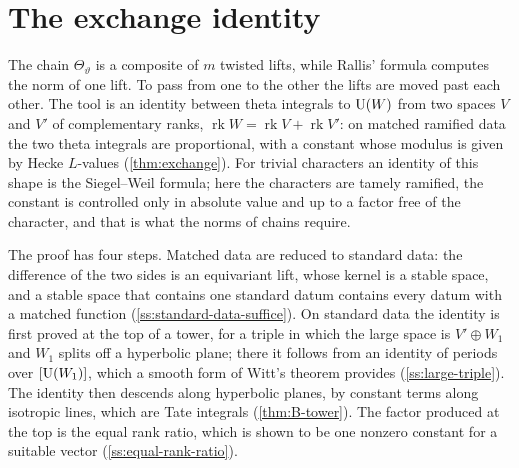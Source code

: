 \section{The exchange identity}\label{sec:exchange}

The chain $\Theta_\vartheta$ is a composite of $m$ twisted lifts, while Rallis' formula computes the norm of one lift. To pass from one to the other the lifts
are moved past each other. The tool is an identity between theta integrals to $\operatorname{U}(W)$ from two spaces $V$ and $V'$ of complementary ranks,
$\operatorname{rk}W=\operatorname{rk}V+\operatorname{rk}V'$: on matched ramified data the two theta integrals are proportional, with a constant whose modulus is given by Hecke
$L$-values (\cref{thm:exchange}). For trivial characters an identity of this shape is the Siegel--Weil formula; here the characters are tamely ramified, the
constant is controlled only in absolute value and up to a factor free of the character, and that is what the norms of chains require.

The proof has four steps. Matched data are reduced to standard data: the difference of the two sides is an equivariant lift, whose kernel is a stable space, and a stable space that contains one
standard datum contains every datum with a matched function (\cref{ss:standard-data-suffice}). On standard data the identity is first proved at the top of a tower, for a triple in which the large space is
$V'\oplus W_1$ and $W_1$ splits off a hyperbolic plane; there it follows from an identity of periods over $[\operatorname{U}(W_1)]$, which a smooth form of Witt's theorem provides (\cref{ss:large-triple}). The identity
then descends along hyperbolic planes, by constant terms along isotropic lines, which are Tate integrals (\cref{thm:B-tower}). The factor produced at the top is the equal rank ratio, which is shown to be one
nonzero constant for a suitable vector (\cref{ss:equal-rank-ratio}).

